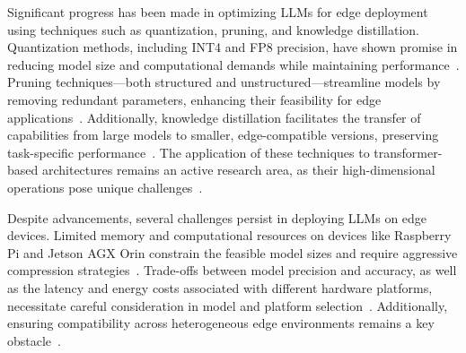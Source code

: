 \documentclass[conference]{IEEEtran}
\begin{document}
Significant progress has been made in optimizing LLMs for edge deployment using techniques such as quantization, pruning, and knowledge distillation. Quantization methods, including INT4 and FP8 precision, have shown promise in reducing model size and computational demands while maintaining performance~\cite{zheng2024review, dhar2024empirical, chitty2024llm}. Pruning techniques—both structured and unstructured—streamline models by removing redundant parameters, enhancing their feasibility for edge applications~\cite{zheng2024review}. Additionally, knowledge distillation facilitates the transfer of capabilities from large models to smaller, edge-compatible versions, preserving task-specific performance~\cite{zheng2024review}. The application of these techniques to transformer-based architectures remains an active research area, as their high-dimensional operations pose unique challenges~\cite{zheng2024review, dhar2024empirical}.


Despite advancements, several challenges persist in deploying LLMs on edge devices. Limited memory and computational resources on devices like Raspberry Pi and Jetson AGX Orin constrain the feasible model sizes and require aggressive compression strategies~\cite{dhar2024empirical, chitty2024llm}. Trade-offs between model precision and accuracy, as well as the latency and energy costs associated with different hardware platforms, necessitate careful consideration in model and platform selection~\cite{pandelea2023selecting, chitty2024llm}. Additionally, ensuring compatibility across heterogeneous edge environments remains a key obstacle~\cite{zheng2024review}.

\end{document}
